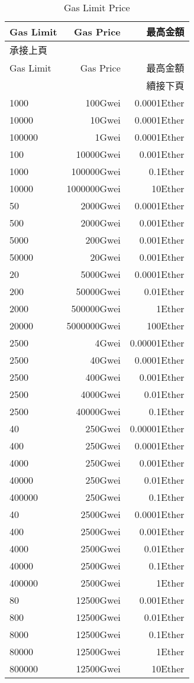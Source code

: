 \begin{longtable}{@{}lrr@{}}
\caption{Gas Limit Price}
\label{tb:Gaslimitprice}\\
\toprule
Gas Limit& Gas Price& 最高金額\\
\midrule
\endfirsthead
\multicolumn{3}{l}{承接上頁}\\[2pt]
\toprule
Gas Limit& Gas Price& 最高金額\\
\midrule
\endhead
\midrule
\multicolumn{3}{r}{續接下頁}
\endfoot
\endlastfoot
100     &1000Gwei    &0.0001Ether\\
1000    &100Gwei     &0.0001Ether\\
10000   &10Gwei      &0.0001Ether\\
100000  &1Gwei       &0.0001Ether\\
100     &10000Gwei   &0.001Ether\\
1000    &100000Gwei  &0.1Ether\\
10000   &1000000Gwei &10Ether\\
50      &2000Gwei    &0.0001Ether\\
500     &2000Gwei    &0.001Ether\\
5000    &200Gwei     &0.001Ether\\
50000   &20Gwei      &0.001Ether\\
20      &5000Gwei    &0.0001Ether\\
200     &50000Gwei   &0.01Ether\\
2000    &500000Gwei  &1Ether\\
20000   &5000000Gwei &100Ether\\
2500    &4Gwei       &0.00001Ether\\
2500    &40Gwei      &0.0001Ether\\
2500    &400Gwei     &0.001Ether\\
2500    &4000Gwei    &0.01Ether\\
2500    &40000Gwei   &0.1Ether\\
40      &250Gwei     &0.00001Ether\\
400     &250Gwei     &0.0001Ether\\
4000    &250Gwei     &0.001Ether\\
40000   &250Gwei     &0.01Ether\\
400000  &250Gwei     &0.1Ether\\
40      &2500Gwei    &0.0001Ether\\
400     &2500Gwei    &0.001Ether\\
4000    &2500Gwei    &0.01Ether\\
40000   &2500Gwei    &0.1Ether\\
400000  &2500Gwei    &1Ether\\
80      &12500Gwei   &0.001Ether\\
800     &12500Gwei   &0.01Ether\\
8000    &12500Gwei   &0.1Ether\\
80000   &12500Gwei   &1Ether\\
800000  &12500Gwei   &10Ether\\
\bottomrule
\end{longtable}
